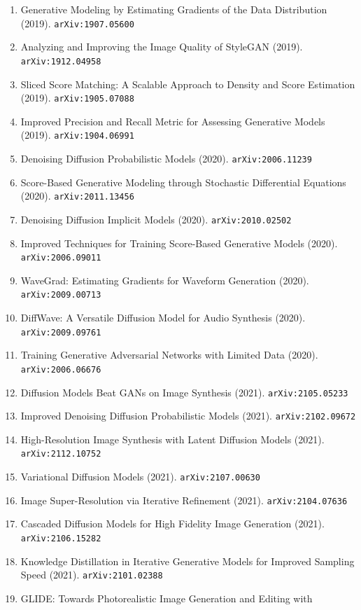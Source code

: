 \documentclass[11pt]{article}
\begin{document}
\begin{enumerate}
  \item Generative Modeling by Estimating Gradients of the Data Distribution (2019). \texttt{arXiv:1907.05600}
  \item Analyzing and Improving the Image Quality of StyleGAN (2019). \texttt{arXiv:1912.04958}
  \item Sliced Score Matching: A Scalable Approach to Density and Score
  Estimation (2019). \texttt{arXiv:1905.07088}
  \item Improved Precision and Recall Metric for Assessing Generative Models (2019). \texttt{arXiv:1904.06991}
  \item Denoising Diffusion Probabilistic Models (2020). \texttt{arXiv:2006.11239}
  \item Score-Based Generative Modeling through Stochastic Differential
  Equations (2020). \texttt{arXiv:2011.13456}
  \item Denoising Diffusion Implicit Models (2020). \texttt{arXiv:2010.02502}
  \item Improved Techniques for Training Score-Based Generative Models (2020). \texttt{arXiv:2006.09011}
  \item WaveGrad: Estimating Gradients for Waveform Generation (2020). \texttt{arXiv:2009.00713}
  \item DiffWave: A Versatile Diffusion Model for Audio Synthesis (2020). \texttt{arXiv:2009.09761}
  \item Training Generative Adversarial Networks with Limited Data (2020). \texttt{arXiv:2006.06676}
  \item Diffusion Models Beat GANs on Image Synthesis (2021). \texttt{arXiv:2105.05233}
  \item Improved Denoising Diffusion Probabilistic Models (2021). \texttt{arXiv:2102.09672}
  \item High-Resolution Image Synthesis with Latent Diffusion Models (2021). \texttt{arXiv:2112.10752}
  \item Variational Diffusion Models (2021). \texttt{arXiv:2107.00630}
  \item Image Super-Resolution via Iterative Refinement (2021). \texttt{arXiv:2104.07636}
  \item Cascaded Diffusion Models for High Fidelity Image Generation (2021). \texttt{arXiv:2106.15282}
  \item Knowledge Distillation in Iterative Generative Models for Improved
  Sampling Speed (2021). \texttt{arXiv:2101.02388}
  \item GLIDE: Towards Photorealistic Image Generation and Editing with

\end{enumerate}
\end{document}
